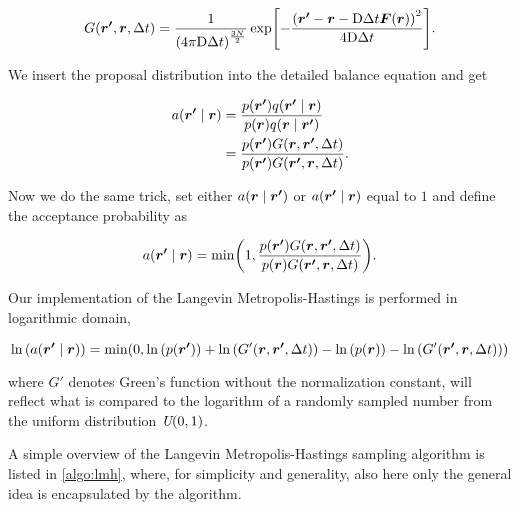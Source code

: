 
\begin{equation}
    G\qty(\bm{r'}, \bm{r}, \Delta t) = \frac{1}{\qty(4\pi\mathrm{D}\Delta t)^{\frac{3N}{2}}}\exp[-\frac{\qty(\bm{r'}-\bm{r}-\mathrm{D}\Delta t\bm{F}\qty(\bm{r}))^2}{4\mathrm{D}\Delta t}].
\end{equation}

We insert the proposal distribution into the detailed balance equation and get 

\begin{align*}
    a\qty(\bm{r'}\mid\bm{r})&= \frac{p\qty({\bm{r'}})q\qty(\bm{r'}\mid\bm{r})}{p\qty({\bm{r}})q\qty(\bm{r}\mid\bm{r'})}
    \\
    &= \frac{p\qty({\bm{r'}})G\qty(\bm{r}, \bm{r'}, \Delta t)}{p\qty({\bm{r'}})G\qty(\bm{r'}, \bm{r}, \Delta t)}.
\end{align*}

Now we do the same trick, set either $a\qty(\bm{r}\mid\bm{r'})$ or $a\qty({\bm{r'}\mid\bm{r}})$ equal to $1$ and define the acceptance probability as 

\begin{equation}
    a\qty(\bm{r'}\mid\bm{r}) = \mathrm{min}\qty(1, \frac{p\qty({\bm{r'}})G\qty(\bm{r}, \bm{r'}, \Delta t)}{p\qty({\bm{r}})G\qty(\bm{r'}, \bm{r}, \Delta t)}).
\end{equation}

Our implementation of the Langevin Metropolis-Hastings is performed in logarithmic domain,  

\begin{equation}
    \ln{\qty(a\qty(\bm{r'}\mid\bm{r}))} = \mathrm{min}\qty(0, \ln{\qty(p\qty(\bm{r'}))} + \ln{\qty(G'\qty(\bm{r}, \bm{r'}, \Delta t))} - \ln{\qty(p\qty(\bm{r}))}-\ln{\qty(G'\qty(\bm{r'}, \bm{r}, \Delta t))})
\end{equation}

where $G'$ denotes Green's function without the normalization constant, will reflect what is compared to the logarithm of a randomly sampled number from the uniform distribution $\textit{U}\qty(0, 1)$. 

A simple overview of the Langevin Metropolis-Hastings sampling algorithm is listed in \autoref{algo:lmh}, where, for simplicity and generality, also here only the general idea is encapsulated by the algorithm. 

